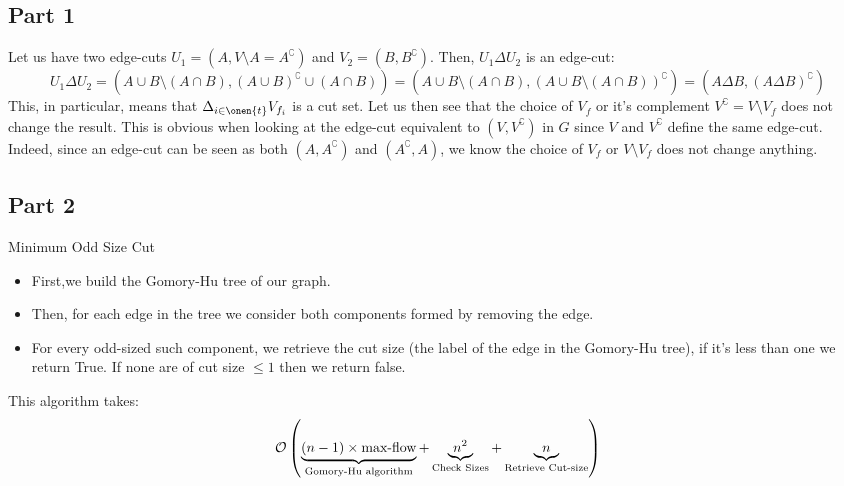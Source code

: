 \documentclass[math, info]{cours}
\begin{document}
\subsection{Part 1}
Let us have two edge-cuts $U_{1} = (A, V \setminus A = A^{\complement})$ and $V_{2} = (B, B^{\complement})$.
Then, $U_{1} \Delta U_{2}$ is an edge-cut:
\begin{equation*}
	U_{1} \Delta U_{2} = \left(A \cup B \setminus \left(A\cap B\right), \left(A\cup B\right)^{\complement} \cup \left( A \cap B \right) \right) = \left(A \cup B \setminus \left(A\cap B\right), \left(A \cup B \setminus \left(A\cap B\right) \right)^{\complement} \right) = \left( A\Delta B, \left(A\Delta B \right)^{\complement} \right)
\end{equation*}
This, in particular, means that $\Delta_{i \in \onen{t}} V_{f_{i}}$ is a cut set.
Let us then see that the choice of $V_{f}$ or it's complement $V^{\complement} = V \setminus V_{f}$ does not change the result.
This is obvious when looking at the edge-cut equivalent to $(V, V^{\complement})$ in $G$ since $V$ and $V^{\complement}$ define the same edge-cut.
Indeed, since an edge-cut can be seen as both $(A, A^{\complement})$ and $(A^{\complement}, A)$, we know the choice of $V_{f}$ or $V\setminus V_{f}$ does not change anything.

\subsection{Part 2}
\begin{algorithm}
	\caption{Minimum Odd Size Cut}
	\begin{itemize}
		\item First,we build the Gomory-Hu tree of our graph.
		\item Then, for each edge in the tree we consider both components formed by removing the edge.
		\item For every odd-sized such component, we retrieve the cut size (the label of the edge in the Gomory-Hu tree), if it's less than one we return True.
			If none are of cut size $\leq 1$ then we return false.
	\end{itemize}
\end{algorithm}

This algorithm takes:
\begin{equation*}
	\mathcal{O}\left( \underbrace{(n-1)\times \text{max-flow}}_{\text{Gomory-Hu algorithm}} + \underbrace{n^{2}}_{\text{Check Sizes}} + \underbrace{n}_{\text{Retrieve Cut-size}} \right)
\end{equation*}
\end{document}
